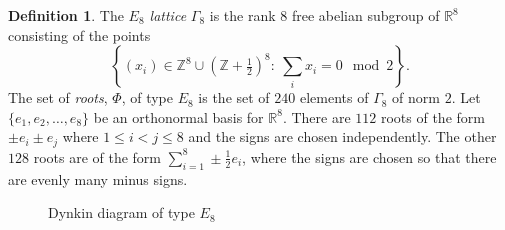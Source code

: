 \documentclass{amsart}
\theoremstyle{plain}
\theoremstyle{definition}
\newtheorem{defn}[theorem]{Definition}
\theoremstyle{remark}
\numberwithin{equation}{section}
\newcommand{\R}{{\mathbb R}}
\newcommand{\Z}{{\mathbb Z}}
\newcommand{\allroots}{\Phi}
\begin{document}
\begin{defn}\label{def:e8}
The {\it $E_8$ lattice} $\Gamma_8$ is the rank $8$ free abelian subgroup of $\R^8$ consisting of the points $$
\left\{ (x_i) \in \Z^8 \cup \left( \Z + \tfrac{1}{2} \right)^8 : \ \sum_i x_i = 0 \mod 2\right\}
.$$ The set of {\it roots}, $\allroots$, of type $E_8$ is the set of $240$ elements of $\Gamma_8$ of norm $2$.
Let $\{e_1, e_2, \ldots, e_8\}$ be an orthonormal basis for $\R^8$. There are $112$ roots of the form
$\pm e_i \pm e_j$ where $1 \leq i < j \leq 8$ and the signs are chosen independently. The other $128$ roots are
of the form $\sum_{i = 1}^8 \pm \tfrac{1}{2}e_i$, where the signs are chosen so that there are evenly many minus 
signs. 
\begin{figure}
\caption{Dynkin diagram of type $E_8$}
\label{fig:e8}
\end{figure}


\end{defn}
\end{document}
